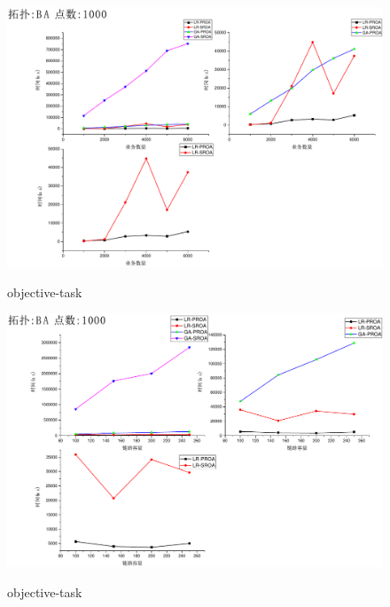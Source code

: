 \begin{figure}
\setlength{\belowcaptionskip}{-0.1cm}
  \begin{center}
    {\includegraphics[width=1 \textwidth]{figures/TI-BA-TA-1000.pdf}}
    \end{center}
  \caption{{\footnotesize{objective-task}}}
  \label{IterNum}
\end{figure}
\begin{figure}
\setlength{\belowcaptionskip}{-0.1cm}
  \begin{center}
    {\includegraphics[width=1 \textwidth]{figures/TI-ER-CA-1000.pdf}}
    \end{center}
  \caption{{\footnotesize{objective-task}}}
  \label{IterNum}
\end{figure}
